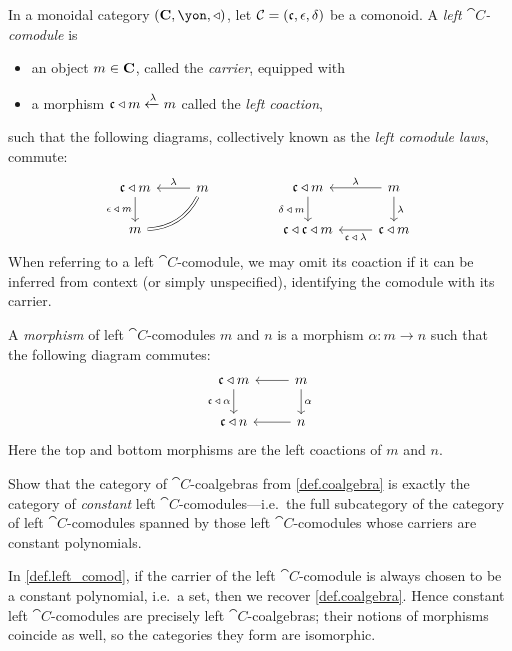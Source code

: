 \documentclass[Book-Poly]{subfiles}
\begin{document}
\begin{definition}\label{def.left_comod}
In a monoidal category $(\Cat{C},\yon,\tri)$, let $\mathcal{C}=(\mathfrak{c},\epsilon,\delta)$ be a comonoid.
A \emph{left $\cat{C}$-comodule} is
\begin{itemize}
    \item an object $m\in\mathbf{C}$, called the \emph{carrier}, equipped with
    \item a morphism $\mathfrak{c}\mathbin{\triangleleft} m\xleftarrow{\lambda}m$ called the \emph{left coaction},
\end{itemize}
such that the following diagrams, collectively known as the \emph{left comodule laws}, commute:
\begin{equation} \label{eqn.left_comod_laws}
\begin{tikzcd}[ampersand replacement=\&]
	\car{c}\tri m\ar[d, "\epsilon\:\tri\:m"']\&
	m\ar[l, "\lambda"']\ar[dl, equal, bend left]\\
	m
\end{tikzcd}
\hspace{.6in}
\begin{tikzcd}[ampersand replacement=\&]
	\car{c}\tri m\ar[d, "\delta\:\tri\:m"']\&
	m\ar[l, "\lambda"']\ar[d, "\lambda"]\\
	\car{c}\tri\car{c}\tri m\&
	\car{c}\tri m\ar[l, "\car{c}\:\tri\:\lambda"]
\end{tikzcd}
\end{equation}
When referring to a left $\cat{C}$-comodule, we may omit its coaction if it can be inferred from context (or simply unspecified), identifying the comodule with its carrier.

A \emph{morphism} of left $\cat{C}$-comodules $m$ and $n$ is a morphism $\alpha\colon m\to n$ such that the following diagram commutes:
\[
\begin{tikzcd}
	\car{c}\tri m \ar[d, "\car{c}\:\tri\:\alpha"'] &
	m \ar[l] \ar[d, "\alpha"] \\
	\car{c}\tri n &
	n \ar[l]
\end{tikzcd}
\]
Here the top and bottom morphisms are the left coactions of $m$ and $n$.
\end{definition}

\begin{exercise} \label{exc.coalg_is_const_l_comod}
Show that the category of $\cat{C}$-coalgebras from \cref{def.coalgebra} is exactly the category of \textit{constant} left $\cat{C}$-comodules---i.e.\ the full subcategory of the category of left $\cat{C}$-comodules spanned by those left $\cat{C}$-comodules whose carriers are constant polynomials.
\begin{solution}
In \cref{def.left_comod}, if the carrier of the left $\cat{C}$-comodule is always chosen to be a constant polynomial, i.e.\ a set, then we recover \cref{def.coalgebra}.
Hence constant left $\cat{C}$-comodules are precisely left $\cat{C}$-coalgebras; their notions of morphisms coincide as well, so the categories they form are isomorphic.
\end{solution}
\end{exercise}
\end{document}
